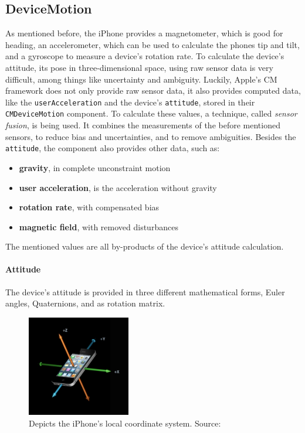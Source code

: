 \subsection{DeviceMotion}
As mentioned before, the iPhone provides a magnetometer, which is good for heading, an accelerometer, which can be used to calculate the phones tip and tilt, and a gyroscope to measure a device's rotation rate. To calculate the device's attitude, its pose in three-dimensional space, using raw sensor data is very difficult, among things like uncertainty and ambiguity. Luckily, Apple's \ac{CM} framework does not only provide raw sensor data, it also provides computed data, like the \texttt{userAcceleration} and the device's \texttt{attitude}, stored in their \texttt{CMDeviceMotion} component. To calculate these values, a technique, called \emph{sensor fusion}, is being used. It combines the measurements of the before mentioned sensors, to reduce bias and uncertainties, and to remove ambiguities. Besides the \texttt{attitude}, the component also provides other data, such as:
\begin{itemize}
  \item \textbf{gravity}, in complete unconstraint motion
  \item \textbf{user acceleration}, is the acceleration without gravity
  \item \textbf{rotation rate}, with compensated bias
  \item \textbf{magnetic field}, with removed disturbances
\end{itemize}

The mentioned values are all by-products of the device's attitude calculation.

\paragraph{Attitude} The device's attitude is provided in three different mathematical forms, Euler angles, Quaternions, and as rotation matrix.

\begin{figure}
	\includegraphics[width=0.4\textwidth]{figures/iphone_coordinatesystem}
	\caption{Depicts the iPhone's local coordinate system. Source:~\citep{apple:wwdc_2012_pham}}
	\label{fig:iphone_cs}
\end{figure}

